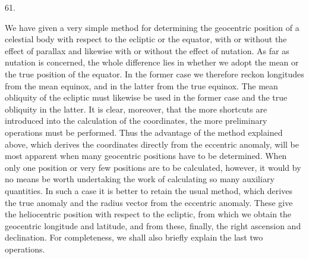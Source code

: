 \par{}\medskip
\hypertarget{native-080-article061}{}
\begin{center}61.\end{center}
We have given a very simple method for determining the geocentric position of a celestial body with respect to the ecliptic or the equator, with or without the effect of parallax and likewise with or without the effect of nutation. As far as nutation is concerned, the whole difference lies in whether we adopt the mean or the true position of the equator. In the former case we therefore reckon longitudes from the mean equinox, and in the latter from the true equinox. The mean obliquity of the ecliptic must likewise be used in the former case and the true obliquity in the latter. It is clear, moreover, that the more shortcuts are introduced into the calculation of the coordinates, the more preliminary operations must be performed. Thus the advantage of the method explained above, which derives the coordinates directly from the eccentric anomaly, will be most apparent when many geocentric positions have to be determined. When only one position or very few positions are to be calculated, however, it would by no means be worth undertaking the work of calculating so many auxiliary quantities. In such a case it is better to retain the usual method, which derives the true anomaly and the radius vector from the eccentric anomaly. These give the heliocentric position with respect to the ecliptic, from which we obtain the geocentric longitude and latitude, and from these, finally, the right ascension and declination. For completeness, we shall also briefly explain the last two operations.
